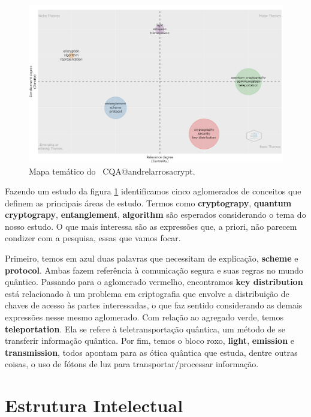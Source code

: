 \begin{figure}
    \centering
    \includegraphics[angle=0,width=1\textwidth]{experiments/andrelarrosacrypt/AnaliseBibliometrica/CriptografiaQuantica/imagens/CQA@andrelarrosacrypt_MapaTematico.png}
    \caption{Mapa temático do \dataset\ CQA@andrelarrosacrypt.}
    \label{CQA@andrelarrosacrypt_MapaTematico}
\end{figure}

Fazendo um estudo da figura \ref{CQA@andrelarrosacrypt_MapaTematico} identificamos cinco aglomerados de conceitos que definem as principais áreas de estudo. Termos como \textbf{cryptograpy}, \textbf{quantum cryptograpy}, \textbf{entanglement}, \textbf{algorithm}  são esperados considerando o tema do nosso estudo. O que mais interessa são as expressões que, a priori, não parecem condizer com a pesquisa, essas que vamos focar.

Primeiro, temos em azul duas palavras que necessitam de explicação, \textbf{scheme} e \textbf{protocol}. Ambas fazem referência à comunicação segura e suas regras no mundo quântico. Passando para o aglomerado vermelho, encontramos \textbf{key distribution} está relacionado à um problema em criptografia que envolve a distribuição de chaves de acesso às partes interessadas, o que faz sentido considerando as demais expressões nesse mesmo aglomerado. Com relação ao agregado verde, temos \textbf{teleportation}. Ela se refere à teletransportação quântica, um método de se transferir informação quântica. Por fim, temos o bloco roxo, \textbf{light}, \textbf{emission} e \textbf{transmission}, todos apontam para as ótica quântica que estuda, dentre outras coisas, o uso de fótons de luz para transportar/processar informação.

\section{Estrutura Intelectual}

